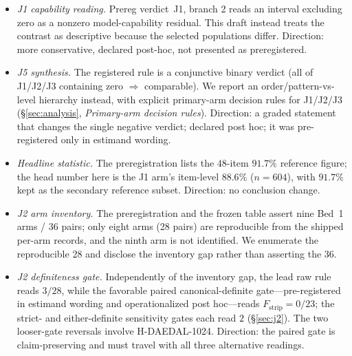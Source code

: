 \documentclass{article}
\newcommand{\pp}{\,\mathrm{pp}}
\begin{document}
\begin{itemize}
        the \emph{word} ``definite'' but not its criterion.  This draft
        operationalizes it (95\% CI excludes $0$; $|\Delta|\gtrsim3.7\pp$) after
        inspecting the data, in the direction that preserves the claim, and
        discloses the rule-dependence in \S\ref{sec:j2}.  Direction:
        data-determined and directionally favorable; not part of the
        pre-registered threshold set.
  \item \emph{J1 capability reading.}  Prereg verdict~J1, branch 2 reads an
        interval excluding zero as a nonzero model-capability residual.  This
        draft instead treats the contrast as descriptive because the selected
        populations differ.  Direction: more conservative, declared post-hoc,
        not presented as preregistered.
  \item \emph{J5 synthesis.}  The registered rule is a conjunctive binary
        verdict (all of J1/J2/J3 containing zero $\Rightarrow$ comparable).  We
        report an order/pattern-vs-level hierarchy instead, with explicit
        primary-arm decision rules for J1/J2/J3 (\S\ref{sec:analysis},
        \emph{Primary-arm decision rules}).  Direction: a
        graded statement that changes the single negative verdict; declared
        post hoc; it was pre-registered only in estimand wording.
  \item \emph{Headline statistic.}  The preregistration lists the
        $48$-item $91.7\%$ reference figure; the head number here is the J1
        arm's item-level $88.6\%$ ($n{=}604$), with $91.7\%$ kept as the
        secondary reference subset.  Direction: no conclusion change.
  \item \emph{J2 arm inventory.}  The preregistration and the frozen table
        assert nine Bed~1 arms / 36 pairs; only eight arms (28 pairs) are
        reproducible from the shipped per-arm records, and the ninth arm is not
        identified.  We enumerate the reproducible 28 and disclose the
        inventory gap rather than asserting the 36.
  \item \emph{J2 definiteness gate.}  Independently of the inventory gap, the
        lead raw rule reads $3/28$, while the favorable paired
        canonical-definite gate---pre-registered in estimand wording and
        operationalized post hoc---reads $F_{\mathrm{strip}}=0/23$; the
        strict- and either-definite
        sensitivity gates each read $2$ (\S\ref{sec:j2}).  The two looser-gate
        reversals involve \textsc{H-DAEDAL-1024}.  Direction: the paired gate is
        claim-preserving and must travel with all three alternative readings.

\end{itemize}
\end{document}
